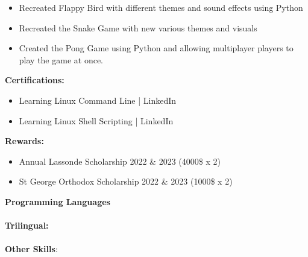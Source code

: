 \documentclass[10pt,a4paper,ragged2e,withhyper]{altacv}
\begin{document}
\begin{paracol}{2}
\begin{itemize}
    \item Recreated Flappy Bird with different themes and sound effects using Python
\end{itemize}

\begin{itemize}
    \item Recreated the Snake Game with new various themes and visuals
\end{itemize}

\begin{itemize}
    \item Created the Pong Game using Python and allowing multiplayer players to play the game at once.
\end{itemize}


\textbf{Certifications:}
\begin{itemize}
    \item Learning Linux Command Line | LinkedIn
    \item Learning Linux Shell Scripting | LinkedIn
\end{itemize}

\textbf{Rewards:}
\begin{itemize}
    \item Annual Lassonde Scholarship 2022 \& 2023 (4000\$ x 2) 
    \item St George Orthodox Scholarship 2022 \& 2023 (1000\$ x 2)
\end{itemize}



\textbf{Programming Languages}\\
\divider
\\
\textbf{Trilingual:}
\\
\divider
\\
\textbf{Other Skills}:
\\
\\
\\


\end{paracol}
\end{document}
